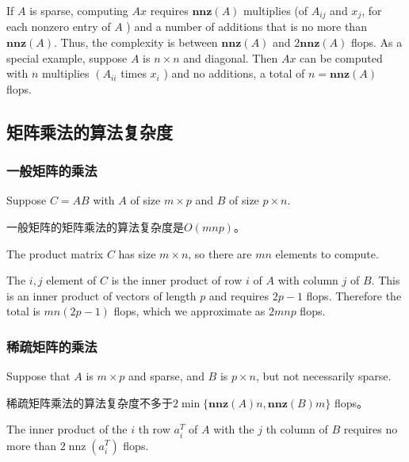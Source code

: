 If $ A $ is sparse, computing $ A x $ requires $ \mathbf{n n z}(A) $ multiplies (of $ A_{i j} $ and $ x_{j} $, for each nonzero entry of $ A $ ) and a number of additions that is no more than $ \mathbf{n n z}(A) $. Thus, the complexity is between $ \mathbf{n n z}(A) $ and $ 2 \mathbf{n n z}(A) $ flops. As a special example, suppose $ A $ is $ n \times n $ and diagonal. Then $ A x $ can be computed with $ n $ multiplies $ \left(A_{i i}\right. $ times $ x_{i} $ ) and no additions, a total of $ n=\mathbf{n n z}(A) $ flops.

\subsection{矩阵乘法的算法复杂度}

\subsubsection{一般矩阵的乘法}

\begin{theorem}
    Suppose $ C=A B $ with $ A $ of size $ m \times p $ and $ B $ of size $ p \times n $.

    一般矩阵的矩阵乘法的算法复杂度是$O(mnp)$。
\end{theorem}



The product matrix $ C $ has size $ m \times n $, so there are $ m n $ elements to compute. 

The $ i, j $ element of $ C $ is the inner product of row $ i $ of $ A $ with column $ j $ of $ B . $ This is an inner product of vectors of length $ p $ and requires $ 2 p-1 $ flops. Therefore the total is $ m n(2 p-1) $ flops, which we approximate as $ 2 m n p $ flops. 

\subsubsection{稀疏矩阵的乘法}

\begin{theorem}
    Suppose that $ A $ is $ m \times p $ and sparse, and $ B $ is $ p \times n $, but not necessarily sparse. 

    稀疏矩阵乘法的算法复杂度不多于$ 2 \min \{\mathbf{n n z}(A) n, \mathbf{n n z}(B) m\} $ flops。
\end{theorem}



The inner product of the $ i $ th row $ a_{i}^{T} $ of $ A $ with the $ j $ th column of $ B $ requires no more than $ 2 \operatorname{nnz}\left(a_{i}^{T}\right) $ flops. 

